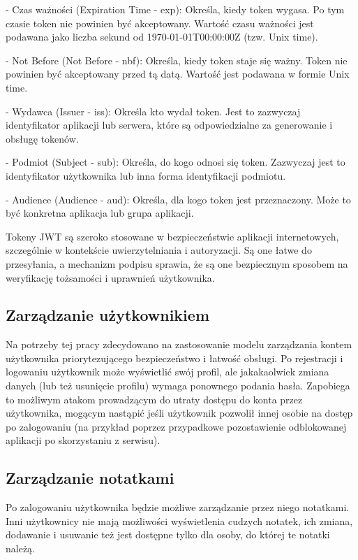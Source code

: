 \documentclass[a4paper,twoside,12pt]{book}
\begin{document}
- Czas ważności (Expiration Time - exp):
    Określa, kiedy token wygasa. Po tym czasie token nie powinien być akceptowany. Wartość czasu ważności jest podawana jako liczba sekund od 1970-01-01T00:00:00Z (tzw. Unix time).

- Not Before (Not Before - nbf):
    Określa, kiedy token staje się ważny. Token nie powinien być akceptowany przed tą datą. Wartość jest podawana w formie Unix time.

- Wydawca (Issuer - iss):
    Określa kto wydał token. Jest to zazwyczaj identyfikator aplikacji lub serwera, które są odpowiedzialne za generowanie i obsługę tokenów.

- Podmiot (Subject - sub):
    Określa, do kogo odnosi się token. Zazwyczaj jest to identyfikator użytkownika lub inna forma identyfikacji podmiotu.

- Audience (Audience - aud):
    Określa, dla kogo token jest przeznaczony. Może to być konkretna aplikacja lub grupa aplikacji.

Tokeny JWT są szeroko stosowane w bezpieczeństwie aplikacji internetowych,
szczególnie w kontekście uwierzytelniania i autoryzacji. Są one łatwe
do przesyłania, a mechanizm podpisu sprawia, że są one bezpiecznym
sposobem na weryfikację tożsamości i uprawnień użytkownika.

\subsection{Zarządzanie użytkownikiem}

Na potrzeby tej pracy zdecydowano na zastosowanie modelu zarządzania 
kontem użytkownika priorytezującego bezpieczeństwo i łatwość obsługi.
Po rejestracji i logowaniu użytkownik może wyświetlić swój profil,
ale jakakaolwiek zmiana danych (lub też usunięcie profilu) wymaga
ponownego podania hasła. Zapobiega to możliwym atakom
prowadzącym do utraty dostępu do konta przez użytkownika, mogącym nastąpić
jeśli użytkownik pozwolił innej osobie na dostęp po zalogowaniu (na przykład
poprzez przypadkowe pozostawienie odblokowanej aplikacji po skorzystaniu z serwisu).

\subsection{Zarządzanie notatkami}

Po zalogowaniu użytkownika będzie możliwe zarządzanie przez niego notatkami.
Inni użytkownicy nie mają możliwości wyświetlenia cudzych notatek, ich zmiana,
dodawanie i usuwanie też jest dostępne tylko dla osoby, do której te notatki należą.
\end{document}
